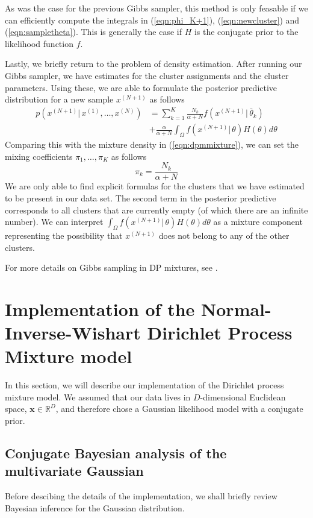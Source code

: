 \documentclass[final,3p,times,twocolumn]{elsarticle}
\let\bs\boldsymbol
\begin{document}
As was the case for the previous Gibbs sampler, this method is only feasable if we can efficiently compute the integrals in (\ref{eqn:phi_K+1}), (\ref{eqn:newcluster}) and (\ref{eqn:sampletheta}).
This is generally the case if $H$ is the conjugate prior to the likelihood function $f$.

Lastly, we briefly return to the problem of density estimation.
After running our Gibbs sampler, we have estimates for the cluster assignments and the cluster parameters.
Using these, we are able to formulate the posterior predictive distribution for a new sample $x^{(N+1)}$ as follows
\begin{equation*}
\begin{split}
p(x^{(N+1)}|\,x^{(1)},\dots,x^{(N)}) &= \sum_{k=1}^K \frac{N_k}{\alpha+N}f(x^{(N+1)}|\,\bar\theta_k)\\
&+ \frac{\alpha}{\alpha+N}\int_\Omega f(x^{(N+1)}|\,\theta)H(\theta)d\theta
\end{split}
\end{equation*}
Comparing this with the mixture density in (\ref{eqn:dpmmixture}), we can set the mixing coefficients $\pi_1,\dots,\pi_K$ as follows
\begin{equation*}
\pi_k = \frac{N_k}{\alpha+N}
\end{equation*}
We are only able to find explicit formulas for the clusters that we have estimated to be present in our data set.
The second term in the posterior predictive corresponds to all clusters that are currently empty (of which there are an infinite number).
We can interpret $\int_\Omega f(x^{(N+1)}|\,\theta)H(\theta)d\theta$ as a mixture component representing the possibility that $x^{(N+1)}$ does not belong to any of the other clusters. 

For more details on Gibbs sampling in DP mixtures, see \cite{neal2000,orbanz2014}.


\section{Implementation of the Normal-Inverse-Wishart Dirichlet Process Mixture model}
\label{sect:implementation}
In this section, we will describe our implementation of the Dirichlet process mixture model.
We assumed that our data lives in $D$-dimensional Euclidean space, $\bs x \in \mathbb{R}^D$, and therefore chose a Gaussian likelihood model with a conjugate prior.

\subsection{Conjugate Bayesian analysis of the multivariate Gaussian}
Before descibing the details of the implementation, we shall briefly review Bayesian inference for the Gaussian distribution.
\end{document}
